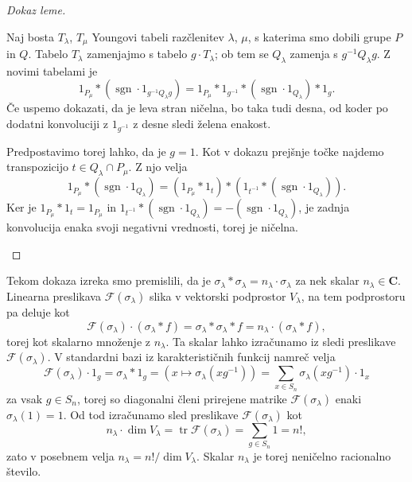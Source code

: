 \documentclass[11pt]{book}
\def\CC{\mathbf{C}}
\def\Fcal{\mathcal{F}}
\def\youngsym{\sigma_{\lambda}}
\DeclareMathOperator\sgn{sgn}
\DeclareMathOperator\tr{tr}
\theoremstyle{definition}
\theoremstyle{zgled}
\theoremstyle{odprtproblem}
\theoremstyle{domacanaloga}
\newenvironment{dokaz}
    {\color{siva}\begin{proof}}
    {\end{proof}}
\theoremstyle{izrek}
\begin{document}
\begin{dokaz}[Dokaz leme]
\begin{enumerate}
    Naj bosta $T_{\lambda}$, $T_{\mu}$ Youngovi tabeli razčlenitev $\lambda$, $\mu$, s katerima smo dobili grupe $P$ in $Q$. Tabelo $T_{\lambda}$ zamenjajmo s tabelo $g \cdot T_{\lambda}$; ob tem se $Q_{\lambda}$ zamenja s $g^{-1} Q_{\lambda} g$. Z novimi tabelami je
    \[
        1_{P_\mu} * (\sgn \cdot 1_{g^{-1} Q_{\lambda} g}) = 1_{P_\mu} * 1_{g^{-1}} * (\sgn \cdot 1_{Q_{\lambda}}) * 1_g.
    \]
    Če uspemo dokazati, da je leva stran ničelna, bo taka tudi desna, od koder po dodatni konvoluciji z $1_{g^{-1}}$ z desne sledi želena enakost.

    Predpostavimo torej lahko, da je $g = 1$. Kot v dokazu prejšnje točke najdemo transpozicijo $t \in Q_{\lambda} \cap P_{\mu}$. Z njo velja
    \[
        1_{P_{\mu}} * (\sgn \cdot 1_{Q_{\lambda}}) = 
        \left( 1_{P_{\mu}} * 1_t \right) * \left( 1_{t^{-1}} * (\sgn \cdot 1_{Q_{\lambda}}) \right).
    \]
    Ker je $1_{P_{\mu}} * 1_t = 1_{P_{\mu}}$ in $1_{t^{-1}} * (\sgn \cdot 1_{Q_{\lambda}}) = - (\sgn \cdot 1_{Q_{\lambda}})$, je zadnja konvolucija enaka svoji negativni vrednosti, torej je ničelna.
\end{enumerate}
\end{dokaz}

Tekom dokaza izreka smo premislili, da je $\youngsym * \youngsym = n_{\lambda} \cdot \youngsym$ za nek skalar $n_{\lambda} \in \CC$. Linearna preslikava $\Fcal(\youngsym)$ slika v vektorski podprostor $V_{\lambda}$, na tem podprostoru pa deluje kot
\[
    \Fcal(\youngsym) \cdot (\youngsym * f) 
    = \youngsym * \youngsym * f
    = n_{\lambda} \cdot (\youngsym * f),
\]
torej kot skalarno množenje z $n_{\lambda}$. Ta skalar lahko izračunamo iz sledi preslikave $\Fcal(\youngsym)$. V standardni bazi iz karakterističnih funkcij namreč velja
\[
    \Fcal(\youngsym) \cdot 1_g
    = \youngsym * 1_g
    = \left( x \mapsto \youngsym(x g^{-1}) \right)
    = \sum_{x \in S_n} \youngsym(x g^{-1}) \cdot 1_x
\]
za vsak $g \in S_n$, torej so diagonalni členi prirejene matrike $\Fcal(\youngsym)$ enaki $\youngsym(1) = 1$. Od tod izračunamo sled preslikave $\Fcal(\youngsym)$ kot
\[
    n_{\lambda} \cdot \dim V_{\lambda} 
    = \tr \Fcal(\youngsym)
    = \sum_{g \in S_n} 1
    = n!,
\]
zato v posebnem velja $n_{\lambda} = n! / \dim V_{\lambda}$. Skalar $n_{\lambda}$ je torej neničelno racionalno število.
\end{document}
